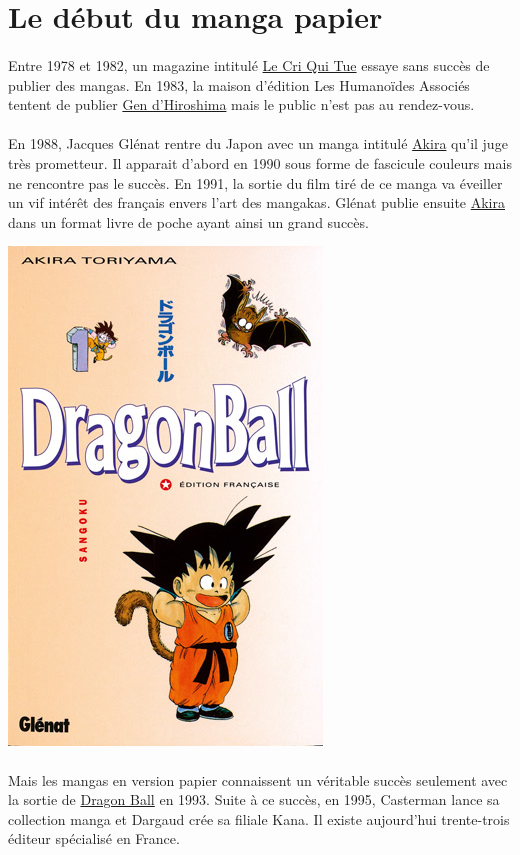 \section{Le début du manga papier}
\paragraph{}
Entre 1978 et 1982, un magazine intitulé \underline{Le Cri Qui Tue} essaye sans succès de publier des mangas. En 1983, la maison d’édition Les Humanoïdes Associés tentent de publier \underline{Gen d’Hiroshima} mais le public n’est pas au rendez-vous. 
\paragraph{}
En 1988, Jacques Glénat rentre du Japon avec un manga intitulé \underline{Akira} qu’il juge très prometteur. Il apparait d’abord en 1990 sous forme de fascicule couleurs mais ne rencontre pas le succès. En 1991, la sortie du film tiré de ce manga va éveiller un vif intérêt des français envers l’art des mangakas. Glénat publie ensuite \underline{Akira} dans un format livre de poche ayant ainsi un grand succès. 
\begin{center}
\includegraphics[scale=0.3]{dragonball.jpg}
\end{center}
\paragraph{}
Mais les mangas en version papier connaissent un véritable succès seulement avec la sortie de \underline{Dragon Ball} en 1993. Suite à ce succès, en 1995, Casterman lance sa collection manga et Dargaud crée sa filiale Kana.  Il existe 	aujourd’hui trente-trois éditeur spécialisé en France.

